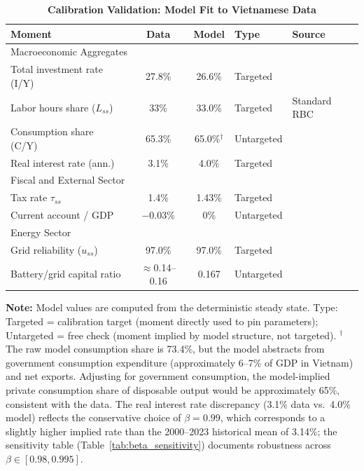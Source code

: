 	\begin{table}[H]
		\centering
		\caption[Calibration Validation: Model Fit to Vietnamese Data]{\textbf{Calibration Validation: Model Fit to Vietnamese Data}}
		\label{tab:validation}
		\renewcommand{\arraystretch}{1.3}
		\small
		\begin{tabular}{l c c l p{3.5cm}}
			\toprule
			\textbf{Moment} & \textbf{Data} & \textbf{Model} & \textbf{Type} & \textbf{Source} \\
			\midrule
			\multicolumn{5}{l}{Macroeconomic Aggregates} \\
			Total investment rate (I/Y) & 27.8\% & 26.6\% & Targeted & \citep{gso2024} \\
			Labor hours share ($L_{ss}$) & 33\% & 33.0\% & Targeted & Standard RBC \\
			Consumption share (C/Y) & 65.3\% & 65.0\%$^{\dagger}$ & Untargeted & \citep{gso2024} \\
			Real interest rate (ann.) & 3.1\% & 4.0\% & Targeted & \citep{worldbank2024} \\
			\midrule
			\multicolumn{5}{l}{Fiscal and External Sector} \\
			Tax rate $\tau_{ss}$ & 1.4\% & 1.43\% & Targeted & \citep{mof2023} \\
			Current account / GDP & $-0.03\%$ & 0\% & Untargeted & \citep{worldbank2024} \\
			\midrule
			\multicolumn{5}{l}{Energy Sector} \\
			Grid reliability ($u_{ss}$) & 97.0\% & 97.0\% & Targeted & \citep{evn2023} \\
			Battery/grid capital ratio & $\approx$0.14--0.16 & 0.167 & Untargeted & \citep{mof2023} \\
			\bottomrule
		\end{tabular}
		\vspace{0.2cm}
		\parbox{\textwidth}{\footnotesize \textbf{Note:} Model values are computed from the deterministic steady state. Type: Targeted = calibration target (moment directly used to pin parameters); Untargeted = free check (moment implied by model structure, not targeted). $^{\dagger}$The raw model consumption share is 73.4\%, but the model abstracts from government consumption expenditure (approximately 6--7\% of GDP in Vietnam) and net exports. Adjusting for government consumption, the model-implied private consumption share of disposable output would be approximately 65\%, consistent with the data. The real interest rate discrepancy (3.1\% data vs.\ 4.0\% model) reflects the conservative choice of $\beta = 0.99$, which corresponds to a slightly higher implied rate than the 2000--2023 historical mean of 3.14\%; the sensitivity table (Table~\ref{tab:beta_sensitivity}) documents robustness across $\beta \in [0.98, 0.995]$.}
	\end{table}
	
